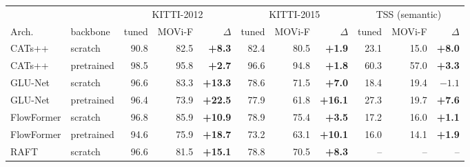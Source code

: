 \begin{tabular}{ll rrr rrr rrr}
\toprule
 & & \multicolumn{3}{c}{KITTI-2012} & \multicolumn{3}{c}{KITTI-2015} & \multicolumn{3}{c}{TSS (semantic)} \\
\cmidrule(lr){3-5}\cmidrule(lr){6-8}\cmidrule(lr){9-11}
Arch. & backbone & tuned & MOVi-F & $\Delta$ & tuned & MOVi-F & $\Delta$ & tuned & MOVi-F & $\Delta$ \\
\midrule
CATs++  & scratch     & 90.8 & 82.5 & \textbf{+8.3}  & 82.4 & 80.5 & \textbf{+1.9}  & 23.1 & 15.0 & \textbf{+8.0} \\
CATs++  & pretrained  & 98.5 & 95.8 & \textbf{+2.7}  & 96.6 & 94.8 & \textbf{+1.8}  & 60.3 & 57.0 & \textbf{+3.3} \\
\midrule
GLU-Net & scratch     & 96.6 & 83.3 & \textbf{+13.3} & 78.6 & 71.5 & \textbf{+7.0}  & 18.4 & 19.4 & $-1.1$ \\
GLU-Net & pretrained  & 96.4 & 73.9 & \textbf{+22.5} & 77.9 & 61.8 & \textbf{+16.1} & 27.3 & 19.7 & \textbf{+7.6} \\
\midrule
FlowFormer & scratch    & 96.8 & 85.9 & \textbf{+10.9} & 78.9 & 75.4 & \textbf{+3.5}  & 17.2 & 16.0 & \textbf{+1.1} \\
FlowFormer & pretrained & 94.6 & 75.9 & \textbf{+18.7} & 73.2 & 63.1 & \textbf{+10.1} & 16.0 & 14.1 & \textbf{+1.9} \\
\midrule
RAFT       & scratch     & 96.6 & 81.5 & \textbf{+15.1} & 78.8 & 70.5 & \textbf{+8.3} & -- & -- & -- \\
\bottomrule
\end{tabular}
